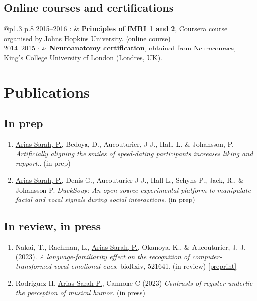 \documentclass[a4paper, 11pt]{article}
\newlength{\mytab}
\begin{document}
\subsection*{Online courses and certifications}
\hspace{-0.3cm}\begin{longtable}{@{}p{1.3\mytab} p{.8\linewidth}}
2015--2016 : & {\bf Principles of fMRI 1 and 2}, Coursera course organised by Johns Hopkins University. (online course) \\[4pt]
2014--2015 : & {\bf Neuroanatomy certification}, obtained from Neurocourses, King's College University of London (Londres, UK). \\[4pt]
\end{longtable}

\section{Publications}
\subsection*{In prep}

\begin{enumerate}[1.]

\item \ul{Arias Sarah, P.}, Bedoya, D., Aucouturier, J-J., Hall, L. \& Johansson, P. \emph{Artificially aligning  the smiles of speed-dating participants increases liking and rapport.}. (in prep)

\item \ul{Arias Sarah, P.}, Denis G., Aucouturier J-J., Hall L., Schyns P., Jack, R., \& Johansson P. \emph{DuckSoup: An open-source experimental platform to  manipulate facial and vocal signals during social interactions}. (in prep)	

\end{enumerate}


\subsection*{In review, in press}

\begin{enumerate}[1.]
\item Nakai, T., Rachman, L., \ul{Arias Sarah, P.}, Okanoya, K., \& Aucouturier, J. J. (2023). \emph{A language-familiarity effect on the recognition of computer-transformed vocal emotional cues}. bioRxiv, 521641. (in review) {\footnotesize \href{https://www.biorxiv.org/content/biorxiv/early/2019/01/17/521641.full.pdf}{[preprint]} }

\item Rodriguez H, \ul{Arias Sarah P.}, Cannone C (2023) \emph{Contrasts of register underlie the perception of musical humor}. (in press)
\end{enumerate}
\end{document}
